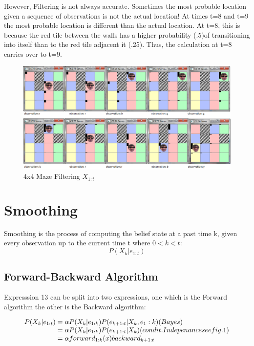 \documentclass[a4paper]{article}
\begin{document}
However, Filtering is not always accurate. Sometimes the most probable location given a sequence of observations is not the actual location! At times t=8 and t=9 the most probable location is different than the actual location. At t=8, this is because the red tile between the walls has a higher probability (.5)of transitioning into itself than to the red tile adjacent it (.25). Thus, the calculation at t=8 carries over to t=9.
\begin{figure}[H]
\centering
\includegraphics[width=1\textwidth]{4x4WallMazeFilter.png}
\caption{\label{fig:4x4 maze}4x4 Maze Filtering $X_{1:t}$}
\end{figure}


\section{Smoothing}

Smoothing is the process of computing the belief state at a past time k, given every observation up to the current time t where $0<k<t$:
\begin{equation}
P(X_{k}|e_{1:t})
\end{equation}

\subsection{Forward-Backward Algorithm}


Expresssion 13 can be split into two expressions, one which is the Forward algorithm the other is the Backward algorithm:

\begin{equation}
\begin{array}{l@{}l}

P(X_{k}|e_{1:t}) 
&{}= \alpha P(X_{k}|e_{1:k})P(e_{k+1:t}|X_k, e_1:k)(Bayes)\\
&{}= \alpha P(X_{k}|e_{1:k})P(e_{k+1:t}|X_k)(condit. Indepenance see fig.1)\\
&{}= \alpha forward_{1:k} (x) backward_{k+1:t}

\end{array}
\end{equation}
\end{document}
